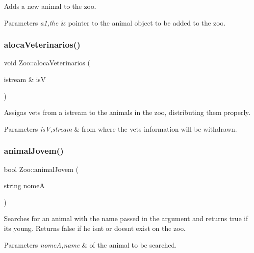 Adds a new animal to the zoo. 
\begin{DoxyParams}{Parameters}
{\em a1,the} & pointer to the animal object to be added to the zoo. \\
\hline
\end{DoxyParams}
\mbox{\label{class_zoo_ae9c4942d74b1a1ab2ca4c8dd9e813e35}} 
\subsubsection{\texorpdfstring{aloca\+Veterinarios()}{alocaVeterinarios()}}
{\footnotesize\ttfamily void Zoo\+::aloca\+Veterinarios (\begin{DoxyParamCaption}\item[{istream \&}]{isV }\end{DoxyParamCaption})}

Assigns vets from a istream to the animals in the zoo, distributing them properly. 
\begin{DoxyParams}{Parameters}
{\em isV,stream} & from where the vets information will be withdrawn. \\
\hline
\end{DoxyParams}
\mbox{\label{class_zoo_ad0a75b142f45a604df773593b9dae897}} 
\subsubsection{\texorpdfstring{animal\+Jovem()}{animalJovem()}}
{\footnotesize\ttfamily bool Zoo\+::animal\+Jovem (\begin{DoxyParamCaption}\item[{string}]{nomeA }\end{DoxyParamCaption})}

Searches for an animal with the name passed in the argument and returns true if its young. Returns false if he isn\textquotesingle{}t or doesn\textquotesingle{}t exist on the zoo. 
\begin{DoxyParams}{Parameters}
{\em nomeA,name} & of the animal to be searched. \\
\hline
\end{DoxyParams}
\mbox{\label{class_zoo_a21318dae5e1ecd14035abbf615ff55fc}} 
